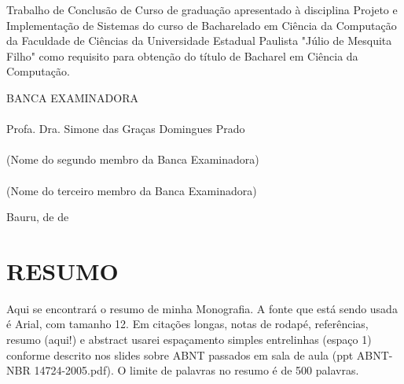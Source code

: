 \documentclass[12pt,a4paper]{article}
\begin{document}
\begin{articleobjective}
	Trabalho de Conclusão de Curso de graduação apresentado à disciplina Projeto e Implementação de Sistemas do curso de Bacharelado em Ciência da Computação da Faculdade de Ciências da Universidade Estadual Paulista "Júlio de Mesquita Filho" como requisito para obtenção do título de Bacharel em Ciência da Computação.
\end{articleobjective}

\begin{center}
	\vspace{1.0cm}
	BANCA EXAMINADORA\\
	
	\vspace{1.0cm}
	\underline{\hspace{8cm}}\\
	Profa. Dra. Simone das Graças Domingues Prado\\
	\vspace{1.0cm}
	\underline{\hspace{8cm}}\\
	(Nome do segundo membro da Banca Examinadora)\\
	\vspace{1.0cm}
	\underline{\hspace{8cm}}\\
	(Nome do terceiro membro da Banca Examinadora)

	\vspace*{\fill} %
	Bauru, \underline{\hspace{1cm}} de \underline{\hspace{3cm}} de \underline{\hspace{1.5cm}}
\end{center}

\clearpage %
\thispagestyle{empty} %
\section*{\hfil RESUMO} %
	\singlespace
	Aqui se encontrará o resumo de minha Monografia.
	A fonte que está sendo usada é Arial, com tamanho 12.
	Em citações longas, notas de rodapé, referências, resumo (aqui!) e abstract usarei espaçamento simples entrelinhas (espaço 1) conforme descrito nos slides sobre ABNT passados em sala de aula (ppt ABNT-NBR 14724-2005.pdf).
	O limite de palavras no resumo é de 500 palavras.
	
\end{document}
